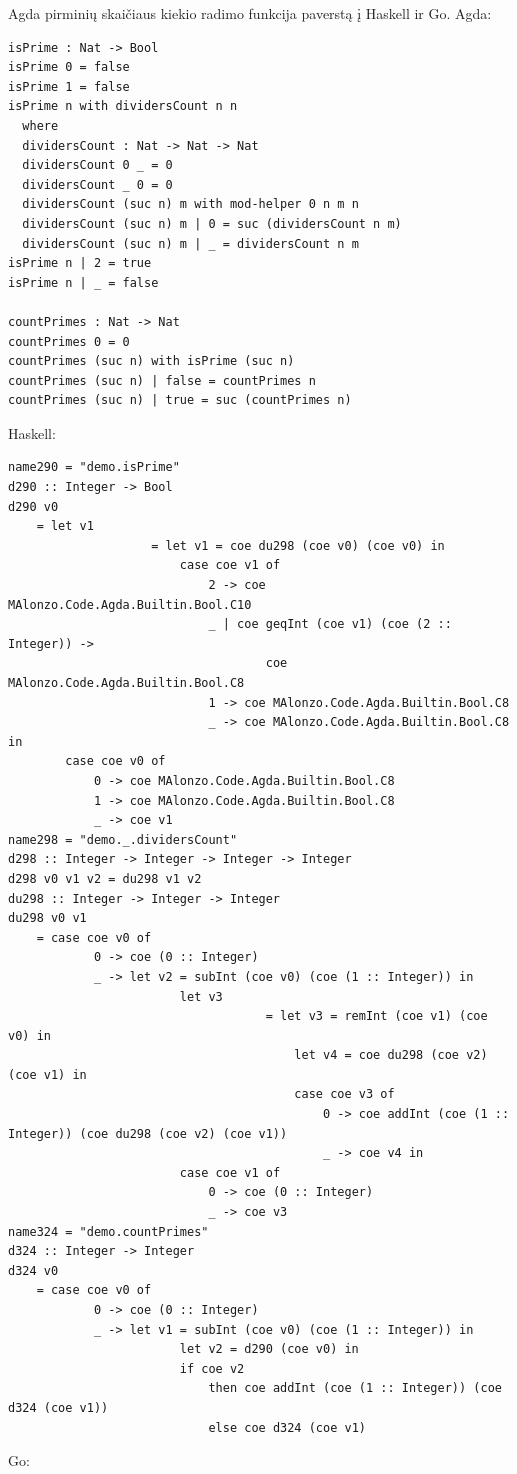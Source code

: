 \documentclass{VUMIFPSkursinis}
\begin{document}
\label{sec:priedas3}
Agda pirminių skaičiaus kiekio radimo funkcija paverstą į Haskell ir Go. \newline
Agda:
\begin{lstlisting}
isPrime : Nat -> Bool
isPrime 0 = false
isPrime 1 = false
isPrime n with dividersCount n n
  where
  dividersCount : Nat -> Nat -> Nat
  dividersCount 0 _ = 0
  dividersCount _ 0 = 0
  dividersCount (suc n) m with mod-helper 0 n m n
  dividersCount (suc n) m | 0 = suc (dividersCount n m)
  dividersCount (suc n) m | _ = dividersCount n m
isPrime n | 2 = true
isPrime n | _ = false  

countPrimes : Nat -> Nat
countPrimes 0 = 0
countPrimes (suc n) with isPrime (suc n)
countPrimes (suc n) | false = countPrimes n
countPrimes (suc n) | true = suc (countPrimes n)
	\end{lstlisting}
Haskell:
\begin{lstlisting}
name290 = "demo.isPrime"
d290 :: Integer -> Bool
d290 v0
	= let v1
					= let v1 = coe du298 (coe v0) (coe v0) in
						case coe v1 of
							2 -> coe MAlonzo.Code.Agda.Builtin.Bool.C10
							_ | coe geqInt (coe v1) (coe (2 :: Integer)) ->
									coe MAlonzo.Code.Agda.Builtin.Bool.C8
							1 -> coe MAlonzo.Code.Agda.Builtin.Bool.C8
							_ -> coe MAlonzo.Code.Agda.Builtin.Bool.C8 in
		case coe v0 of
			0 -> coe MAlonzo.Code.Agda.Builtin.Bool.C8
			1 -> coe MAlonzo.Code.Agda.Builtin.Bool.C8
			_ -> coe v1
name298 = "demo._.dividersCount"
d298 :: Integer -> Integer -> Integer -> Integer
d298 v0 v1 v2 = du298 v1 v2
du298 :: Integer -> Integer -> Integer
du298 v0 v1
	= case coe v0 of
			0 -> coe (0 :: Integer)
			_ -> let v2 = subInt (coe v0) (coe (1 :: Integer)) in
						let v3
									= let v3 = remInt (coe v1) (coe v0) in
										let v4 = coe du298 (coe v2) (coe v1) in
										case coe v3 of
											0 -> coe addInt (coe (1 :: Integer)) (coe du298 (coe v2) (coe v1))
											_ -> coe v4 in
						case coe v1 of
							0 -> coe (0 :: Integer)
							_ -> coe v3
name324 = "demo.countPrimes"
d324 :: Integer -> Integer
d324 v0
	= case coe v0 of
			0 -> coe (0 :: Integer)
			_ -> let v1 = subInt (coe v0) (coe (1 :: Integer)) in
						let v2 = d290 (coe v0) in
						if coe v2
							then coe addInt (coe (1 :: Integer)) (coe d324 (coe v1))
							else coe d324 (coe v1)
	\end{lstlisting}
Go:
\end{document}
